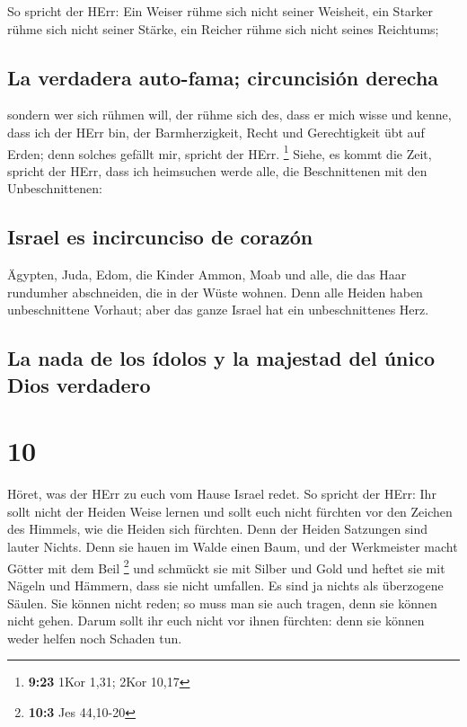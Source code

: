  So spricht der HErr: Ein Weiser rühme sich nicht seiner
Weisheit, ein Starker rühme sich nicht seiner Stärke, ein Reicher rühme
sich nicht seines Reichtums;

\hypertarget{la-verdadera-auto-fama-circuncisiuxf3n-derecha}{%
\subsection{La verdadera auto-fama; circuncisión
derecha}\label{la-verdadera-auto-fama-circuncisiuxf3n-derecha}}

 sondern wer sich rühmen will, der rühme sich des, dass
er mich wisse und kenne, dass ich der HErr bin, der Barmherzigkeit,
Recht und Gerechtigkeit übt auf Erden; denn solches gefällt mir, spricht
der HErr. \footnote{\textbf{9:23} 1Kor 1,31; 2Kor 10,17} 
Siehe, es kommt die Zeit, spricht der HErr, dass ich heimsuchen werde
alle, die Beschnittenen mit den Unbeschnittenen:

\hypertarget{israel-es-incircunciso-de-corazuxf3n}{%
\subsection{Israel es incircunciso de
corazón}\label{israel-es-incircunciso-de-corazuxf3n}}

 Ägypten, Juda, Edom, die Kinder Ammon, Moab und alle,
die das Haar rundumher abschneiden, die in der Wüste wohnen. Denn alle
Heiden haben unbeschnittene Vorhaut; aber das ganze Israel hat ein
unbeschnittenes Herz.

\hypertarget{la-nada-de-los-uxeddolos-y-la-majestad-del-uxfanico-dios-verdadero}{%
\subsection{La nada de los ídolos y la majestad del único Dios
verdadero}\label{la-nada-de-los-uxeddolos-y-la-majestad-del-uxfanico-dios-verdadero}}

\hypertarget{section-9}{%
\section{10}\label{section-9}}

 Höret, was der HErr zu euch vom Hause Israel redet.
 So spricht der HErr: Ihr sollt nicht der Heiden Weise
lernen und sollt euch nicht fürchten vor den Zeichen des Himmels, wie
die Heiden sich fürchten.  Denn der Heiden Satzungen sind
lauter Nichts. Denn sie hauen im Walde einen Baum, und der Werkmeister
macht Götter mit dem Beil \footnote{\textbf{10:3} Jes 44,10-20}
 und schmückt sie mit Silber und Gold und heftet sie mit
Nägeln und Hämmern, dass sie nicht umfallen.  Es sind ja
nichts als überzogene Säulen. Sie können nicht reden; so muss man sie
auch tragen, denn sie können nicht gehen. Darum sollt ihr euch nicht vor
ihnen fürchten: denn sie können weder helfen noch Schaden tun.

